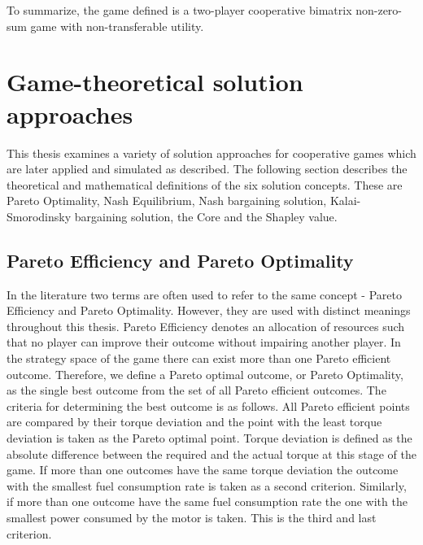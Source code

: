 To summarize, the game defined is a two-player cooperative bimatrix non-zero-sum game with non-transferable utility.

\section{Game-theoretical solution approaches}
This thesis examines a variety of solution approaches for cooperative games which are later applied and simulated as described. The following section describes the theoretical and mathematical definitions of the six solution concepts. These are Pareto Optimality, Nash Equilibrium, Nash bargaining solution, Kalai-Smorodinsky bargaining solution, the Core and the Shapley value.

\subsection{Pareto Efficiency and Pareto Optimality}
In the literature two terms are often used to refer to the same concept - Pareto Efficiency and Pareto Optimality. However, they are used with distinct meanings throughout this thesis. Pareto Efficiency denotes an allocation of resources such that no player can improve their outcome without impairing another player. In the strategy space of the game there can exist more than one Pareto efficient outcome. Therefore, we define a Pareto optimal outcome, or Pareto Optimality, as the single best outcome from the set of all Pareto efficient outcomes. The criteria for determining the best outcome is as follows. All Pareto efficient points are compared by their torque deviation and the point with the least torque deviation is taken as the Pareto optimal point. Torque deviation is defined as the absolute difference between the required and the actual torque at this stage of the game. If more than one outcomes have the same torque deviation the outcome with the smallest fuel consumption rate is taken as a second criterion. Similarly, if more than one outcome have the same fuel consumption rate the one with the smallest power consumed by the motor is taken. This is the third and last criterion.

